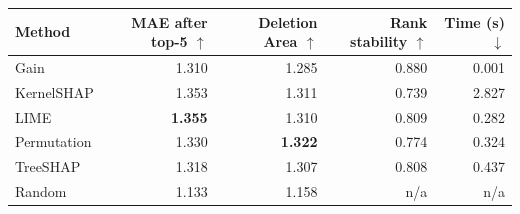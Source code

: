 \begingroup\small\setlength{\tabcolsep}{3pt}
\begin{tabular*}{\linewidth}{@{\extracolsep{\fill}}lrrrr}
\toprule
Method & \shortstack{MAE after\\top-5 $\uparrow$} & \shortstack{Deletion\\Area $\uparrow$} & \shortstack{Rank\\stability $\uparrow$} & \shortstack{Time (s)\\$\downarrow$}\\
\midrule
Gain & 1.310 & 1.285 & 0.880 & 0.001\\
KernelSHAP & 1.353 & 1.311 & 0.739 & 2.827\\
LIME & \textbf{1.355} & 1.310 & 0.809 & 0.282\\
Permutation & 1.330 & \textbf{1.322} & 0.774 & 0.324\\
TreeSHAP & 1.318 & 1.307 & 0.808 & 0.437\\
Random & 1.133 & 1.158 & n/a & n/a\\
\bottomrule
\end{tabular*}\endgroup
